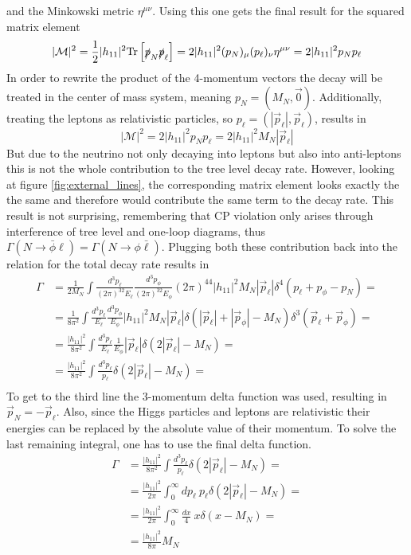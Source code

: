 and the Minkowski metric $\eta^{\mu\nu}$. Using this one gets the final result for the squared matrix element
\begin{equation*}
	|\mathcal{M}|^2=\frac{1}{2}|h_{11}|^2\text{Tr}\left[\slashed p_N \slashed p_\ell\right]=2|h_{11}|^2(p_N)_\mu (p_\ell)_\nu\eta^{\mu\nu}=2|h_{11}|^2p_Np_\ell
\end{equation*}
In order to rewrite the product of the 4-momentum vectors the decay will be treated in the center of mass system, meaning $p_N=(M_N,\vec{0})$. Additionally, treating the leptons as relativistic particles, so $p_\ell=(|\vec{p}_\ell|,\vec{p}_\ell)$, results in
\begin{equation*}
|\mathcal{M}|^2=2|h_{11}|^2p_Np_\ell=2|h_{11}|^2M_N|\vec{p}_\ell|
\end{equation*}
But due to the neutrino not only decaying into leptons but also into anti-leptons this is not the whole contribution to the tree level decay rate. However, looking at figure \ref{fig:external_lines}, the corresponding matrix element looks exactly the the same and therefore would contribute the same term to the decay rate. This result is not surprising, remembering that CP violation only arises through interference of tree level and one-loop diagrams, thus $\Gamma(N\rightarrow\bar{\phi}\ell)=\Gamma(N\rightarrow\phi\bar{\ell})$. Plugging both these contribution back into the relation for the total decay rate results in 
\begin{align*}
	\Gamma&=\frac{1}{2M_N}\int\frac{d^3p_\ell}{(2\pi)^32E_\ell}\frac{d^3p_\phi}{(2\pi)^32E_\phi}(2\pi)^44|h_{11}|^2M_N|\vec{p}_\ell|\delta^4\left(p_\ell+p_\phi-p_N\right)=\\
	&=\frac{1}{8\pi^2}\int\frac{d^3p_\ell}{E_\ell}\frac{d^3p_\phi}{E_\phi}|h_{11}|^2M_N|\vec{p}_\ell|\delta\left(|\vec{p}_\ell|+|\vec{p}_\phi|-M_N\right)\delta^3\left(\vec{p}_\ell+\vec{p}_\phi\right)=\\
	&=\frac{|h_{11}|^2}{8\pi^2}\int\frac{d^3p_\ell}{E_\ell}\frac{1}{E_\phi}|\vec{p}_\ell|\delta\left(2|\vec{p}_\ell|-M_N\right)=\\
	&=\frac{|h_{11}|^2}{8\pi^2}\int\frac{d^3p_\ell}{p_\ell}\delta\left(2|\vec{p}_\ell|-M_N\right)=\\
\end{align*}
To get to the third line the 3-momentum delta function was used, resulting in $\vec{p}_N=-\vec{p}_\ell$. Also, since the Higgs particles and leptons are relativistic their energies can be replaced by the absolute value of their momentum. To solve the last remaining integral, one has to use the final delta function.
\begin{align*}
	\Gamma&=\frac{|h_{11}|^2}{8\pi^2}\int\frac{d^3p_\ell}{p_\ell}\delta\left(2|\vec{p}_\ell|-M_N\right)=\\
	&=\frac{|h_{11}|^2}{2\pi}\int_0^{\infty} dp_\ell \:p_\ell\delta\left(2|\vec{p}_\ell|-M_N\right)=\\
	&=\frac{|h_{11}|^2}{2\pi}\int_0^{\infty} \frac{dx}{4}\:x\delta\left(x-M_N\right)=\\
	&=\frac{|h_{11}|^2}{8\pi}M_N
\end{align*}









